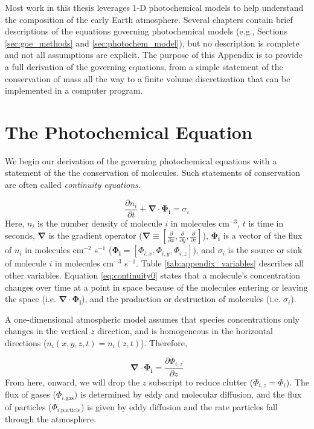 Most work in this thesis leverages 1-D photochemical models to help understand the composition of the early Earth atmosphere. Several chapters contain brief descriptions of the equations governing photochemical models (e.g., Sections \ref{sec:goe_methods} and \ref{sec:photochem_model}), but no description is complete and not all assumptions are explicit. The purpose of this Appendix is to provide a full derivation of the governing equations, from a simple statement of the conservation of mass all the way to a finite volume discretization that can be implemented in a computer program.

\section{The Photochemical Equation} \label{sec:photochem_eqn}

We begin our derivation of the governing photochemical equations with a statement of the the conservation of molecules. Such statements of conservation are often called \emph{continuity equations}.

\begin{equation} \label{eq:continuity0}
  \frac{\partial n_{i}}{\partial t} + \bm{\nabla} \cdot \bm{\Phi_{i}} = \sigma_i
\end{equation}
Here, $n_i$ is the number density of molecule $i$ in molecules cm$^{-3}$, $t$ is time in seconds, $\bm{\nabla}$ is the gradient operator ($\bm{\nabla} \equiv [\frac{\partial}{\partial x}, \frac{\partial}{\partial y}, \frac{\partial}{\partial z}]$), $\bm{\Phi_{i}}$ is a vector of the flux of $n_i$ in molecules cm$^{-2}$ s$^{-1}$ ($\bm{\Phi_{i}} = [\Phi_{i,x},\Phi_{i,y},\Phi_{i,z}]$), and $\sigma_i$ is the source or sink of molecule $i$ in molecules cm$^{-3}$ s$^{-1}$. Table \ref{tab:appendix_variables} describes all other variables. Equation \eqref{eq:continuity0} states that a molecule's concentration changes over time at a point in space because of the molecules entering or leaving the space (i.e. $\bm{\nabla} \cdot \bm{\Phi_{i}}$), and the production or destruction of molecules (i.e. $\sigma_i$). 

A one-dimensional atmospheric model assumes that species concentrations only changes in the vertical $z$ direction, and is homogeneous in the horizontal directions ($n_i(x,y,z,t) = n_i(z,t)$). Therefore,

\begin{equation} \label{eq:1D_flux}
  \bm{\nabla} \cdot \bm{\Phi_{i}} = \frac{\partial \Phi_{i,z}}{\partial z}
\end{equation}
From here, onward, we will drop the $z$ subscript to reduce clutter ($\Phi_{i,z} = \Phi_{i}$). The flux of gases ($\Phi_{i\text{,gas}}$) is determined by eddy and molecular diffusion, and the flux of particles ($\Phi_{i\text{,particle}}$) is given by eddy diffusion and the rate particles fall through the atmosphere.

